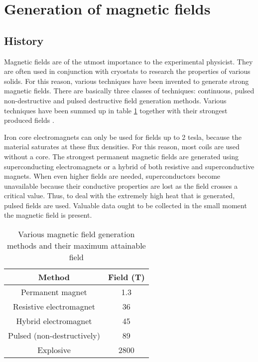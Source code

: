 \section{Generation of magnetic fields}
\subsection{History}

Magnetic fields are of the utmost importance to the experimental physicist.  
They are often used in conjunction with cryostats to research the 
properties of various solids. For this reason, various techniques have been 
invented to generate strong magnetic fields. There are basically three 
classes of techniques: continuous, pulsed non-destructive and pulsed 
destructive field generation methods. Various techniques have been summed 
up in table \ref{methodTable} together with their strongest produced fields 
\cite{highPulsedMagnet} \cite{recordField}.

Iron core electromagnets can only be used for fields up to 2 tesla, because the 
material saturates at these flux densities. For this reason, most coils are 
used without a core. The strongest permanent magnetic fields are generated 
using superconducting electromagnets or a hybrid of both resistive and 
superconductive magnets. When even higher fields are needed, 
superconductors become unavailable because their conductive properties are 
lost as the field crosses a critical value. Thus, to deal with the 
extremely high heat that is generated, pulsed fields are used. Valuable 
data ought to be collected in the small moment the magnetic field is 
present. \cite{herlach} 

\begin{table}
\begin{center}
\caption{Various magnetic field generation methods and their maximum 
attainable field}
\label{methodTable}
\begin{tabular}{c|c}
Method & Field (T) \\
\hline
Permanent magnet & 1.3\\
Resistive electromagnet & 36\\
Hybrid electromagnet & 45\\
Pulsed (non-destructively) & 89\\
Explosive & 2800 \\
\end{tabular}
\end{center}
\end{table}

